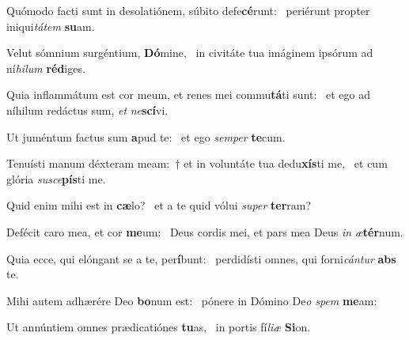 \item Quómodo facti sunt in desolatiónem, súbito defe\textbf{cé}runt:~\psstar{} periérunt propter iniqui\textit{tátem} \textbf{su}am.
\item Velut sómnium surgéntium, \textbf{Dó}mine,~\psstar{} in civitáte tua imáginem ipsórum ad ní\textit{hilum} \textbf{réd}iges.
\item Quia inflammátum est cor meum, et renes mei commu\textbf{tá}ti sunt:~\psstar{} et ego ad níhilum redáctus sum, \textit{et} \textit{ne}\textbf{scí}vi.
\item Ut juméntum factus sum \textbf{a}pud te:~\psstar{} et ego \textit{semper} \textbf{te}cum.
\item Tenuísti manum déxteram meam:~† et in voluntáte tua dedu\textbf{xís}ti me,~\psstar{} et cum glória \textit{susce}\textbf{pís}ti me.
\item Quid enim mihi est in \textbf{cæ}lo?~\psstar{} et a te quid vólui \textit{super} \textbf{ter}ram?
\item Defécit caro mea, et cor \textbf{me}um:~\psstar{} Deus cordis mei, et pars mea Deus \textit{in} \textit{æ}\textbf{tér}num.
\item Quia ecce, qui elóngant se a te, per\textbf{í}bunt:~\psstar{} perdidísti omnes, qui forni\textit{cántur} \textbf{abs} te.
\item Mihi autem adhærére Deo \textbf{bo}num est:~\psstar{} pónere in Dómino De\textit{o} \textit{spem} \textbf{me}am:
\item Ut annúntiem omnes prædicatiónes \textbf{tu}as,~\psstar{} in portis fí\textit{liæ} \textbf{Si}on.
